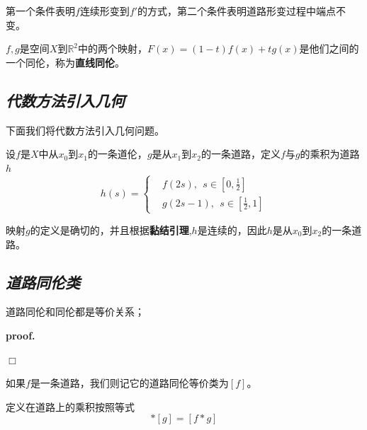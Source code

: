 \vspace*{1em} 

第一个条件表明$f$连续形变到$f'$的方式，第二个条件表明道路形变过程中端点不变。

\begin{example}
    $f,g$是空间$X$到$\mathbb{R}^2$中的两个映射，$F(x)=(1-t)f(x)+tg(x)$是他们之间的一个同伦，称为\textbf{直线同伦}。
\end{example}

\subsection*{\textsl{代数方法引入几何}}

下面我们将代数方法引入几何问题。
\vspace*{1em} 
\begin{define}
    设$f$是$X$中从$x_0$到$x_1$的一条道伦，$g$是从$x_1$到$x_2$的一条道路，定义$f$与$g$的乘积为道路$h$
    \begin{equation}
        h(s)=\begin{cases}
            & f(2s),\ \ s\in [0,\frac{1}{2}]\\
            & g(2s-1),\ \ s\in [\frac{1}{2},1]
        \end{cases}
    \end{equation}

    映射$g$的定义是确切的，并且根据\textbf{黏结引理},$h$是连续的，因此$h$是从$x_0$到$x_2$的一条道路。
\end{define}

\vspace*{1em} 

\subsection*{\textsl{道路同伦类}}

\begin{mdframed}
    \begin{lemma}
        道路同伦和同伦都是等价关系；
    \end{lemma}
\end{mdframed}

\textbf{proof.} 

$\Box$

如果$f$是一条道路，我们则记它的道路同伦等价类为$[f]$。

定义在道路上的乘积按照等式
\begin{equation}
    [f]*[g]=[f*g]
\end{equation}

